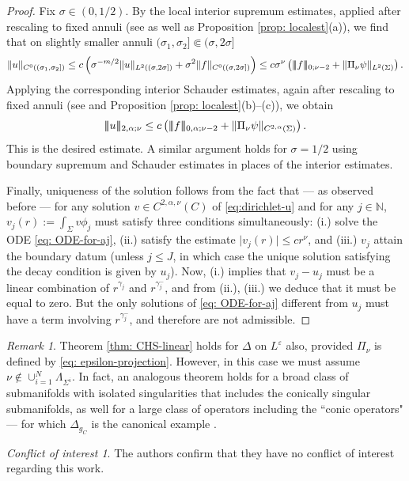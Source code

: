 \documentclass[11pt]{amsart}
\DeclarePairedDelimiter{\tnorm}{\vert\!\vert\!\vert}{\vert\!\vert\!\vert}
\theoremstyle{definition}
\theoremstyle{remark}
\newtheorem{remark}{Remark}
\newtheorem*{coi*}{Conflict of interest}
\begin{document}
\begin{proof}
Fix $\sigma \in (0, 1/2)$. By the local interior supremum estimates, applied
after rescaling to fixed annuli (see \cite[Sections 9.7 \& 9.9]{GT01} as well as Proposition \ref{prop: localest}(a)), we find that on slightly smaller annuli \((\sigma_1, \sigma_2] \Subset (\sigma, 2\sigma]\)
\[
\|u\|_{C^0((\sigma_1, \sigma_2])}
    \leq
    c\left(
        \sigma^{-m/2}\|u\|_{L^2((\sigma, 2\sigma])}
        +
        \sigma^2\|f\|_{C^0((\sigma,2\sigma])}
    \right)
    \leq
    c \sigma^\nu
    \left(
        \tnorm{f}_{0;\nu-2}
        +
        \|\Pi_\nu\psi\|_{L^2(\Sigma)}
    \right).
\]
Applying the corresponding interior Schauder estimates, again
after rescaling to fixed annuli (see \cite[Sections 6.1 \& 6.2]{GT01} and Proposition \ref{prop: localest}(b)--(c)), we
obtain
\[
    \tnorm{u}_{2,\alpha;\nu}
    \leq
    c\left(
        \tnorm{f}_{0,\alpha;\nu-2}
        +
        \|\Pi_\nu\psi\|_{C^{2,\alpha}(\Sigma)}
    \right).
\]
This is the desired estimate. A similar argument holds for $\sigma = 1/2$ using boundary supremum and Schauder estimates in places of the interior estimates. 

Finally, uniqueness of the solution follows from the fact that --- as observed before --- for any solution $v\in C^{2,\alpha,\nu}(C)$ of \eqref{eq:dirichlet-u} and for any $j\in \mathbb{N}$, $v_j(r):=\int_\Sigma v\phi_j$ must satisfy three conditions simultaneously: (i.) solve the ODE \eqref{eq: ODE-for-aj}, (ii.) satisfy the estimate $\lvert v_j(r)\rvert\leq c r^\nu$, and (iii.) $v_j$ attain the boundary datum (unless $j\leq J$, in which case the unique solution satisfying the decay condition is given by $u_j$).
Now, (i.) implies that $v_j-u_j$ must be a linear combination of $r^{\gamma_j}$ and $r^{\gamma_j^-}$, and from (ii.), (iii.) we deduce that it must be equal to zero. But the only solutions of \eqref{eq: ODE-for-aj} different from $u_j$ must have a term involving $r^{\gamma_j^-}$, and therefore are not admissible.
\end{proof}

\begin{remark}\label{rmk: CHS}
    Theorem \ref{thm: CHS-linear} holds for $\Delta$ on $L^\varepsilon$ also, provided $\Pi_\nu$ is defined by \eqref{eq: epsilon-projection}. However, in this case we must assume $\nu \notin \cup_{i=1}^N \Lambda_{\Sigma^i} $. In fact, an analogous theorem holds for a broad class of submanifolds with isolated singularities that includes the conically singular submanifolds, as well for a large class of operators including the ``conic operators" --- for which $\Delta_{g_C}$ is the canonical example \cite[see Theorem 2.3]{Sm93}.
\end{remark}
\begin{coi*}
    The authors confirm that they have no conflict of interest regarding this work.
\end{coi*}
\printbibliography
\end{document}
